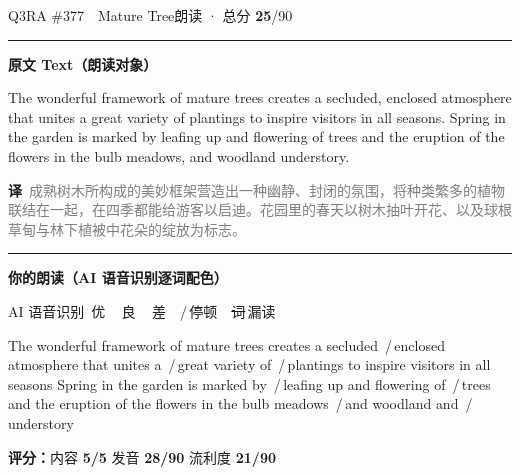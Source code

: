 \documentclass[11pt]{article}
\newcommand{\sfull}[1]{\textcolor{cFix}{\bfseries #1}}     %
\newcommand{\spart}[1]{\textcolor{cPartial}{\bfseries #1}} %
\newcommand{\ptesub}[1]{%
  \par\needspace{2\baselineskip}\smallskip
  {\color{cAccent}\rule[-0.2ex]{3pt}{1.05em}}\hspace{6pt}%
  {\bfseries\color{cHead}#1}\par\nopagebreak\smallskip}
\newcommand{\sg}[1]{\textcolor{cSpkGood}{#1}}   %
\newcommand{\sy}[1]{\textcolor{cSpkOk}{#1}}     %
\newcommand{\sr}[1]{\textcolor{cSpkBad}{#1}}    %
\newcommand{\pse}{{\color{gray}\,/\,}}          %
\newcommand{\asrlegend}{{\footnotesize\color{gray}AI 语音识别\quad
  {\color{cSpkGood}\textbullet}\,优\ \ {\color{cSpkOk}\textbullet}\,良\ \
  {\color{cSpkBad}\textbullet}\,差\ \ {\color{gray}/}\,停顿\ \
  {\color{cSpkBad}\sout{词}}\,漏读}}
\newcommand{\zh}[1]{{\footnotesize\textcolor{cNote}{\textbf{译}}\ \textcolor{gray}{#1}}}
\begin{document}
\begin{qblock}{Q3\quad RA \#377\ \ Mature Tree}{朗读 · 总分 \textcolor{cAccent}{\bfseries 25}/90}
\ptesub{原文 Text（朗读对象）}
\begin{promptbox}
The wonderful framework of mature trees creates a secluded, enclosed atmosphere that unites a great variety of plantings to inspire visitors in all seasons. Spring in the garden is marked by leafing up and flowering of trees and the eruption of the flowers in the bulb meadows, and woodland understory.
\end{promptbox}
\zh{成熟树木所构成的美妙框架营造出一种幽静、封闭的氛围，将种类繁多的植物联结在一起，在四季都能给游客以启迪。花园里的春天以树木抽叶开花、以及球根草甸与林下植被中花朵的绽放为标志。}
\ptesub{你的朗读（AI 语音识别逐词配色）}
\asrlegend
\begin{asrbox}
\sg{The} \sg{wonderful} \sg{framework} \sg{of} \sg{mature} \sy{trees} \sg{creates} \sg{a} \sr{secluded} \pse \sy{enclosed} \sg{atmosphere} \sg{that} \sg{unites} \sg{a} \pse \sg{great} \sg{variety} \sg{of} \pse \sg{plantings} \sg{to} \sg{inspire} \sg{visitors} \sg{in} \sg{all} \sg{seasons} \sg{Spring} \sg{in} \sg{the} \sg{garden} \sg{is} \sg{marked} \sg{by} \pse \sg{leafing} \sg{up} \sg{and} \sg{flowering} \sg{of} \pse \sg{trees} \sg{and} \sg{the} \sy{eruption} \sg{of} \sg{the} \sg{flowers} \sg{in} \sg{the} \sy{bulb} \sy{meadows} \pse \sg{and} \sg{woodland} \sg{and} \pse \sy{understory}
\end{asrbox}
\smallskip
{\small\textbf{评分：}内容 \sfull{5/5} \quad\textperiodcentered\quad 发音 \spart{28/90} \quad\textperiodcentered\quad 流利度 \spart{21/90}}\quad{\footnotesize\color{gray}（用时 01:07）}
\end{qblock}
\end{document}
